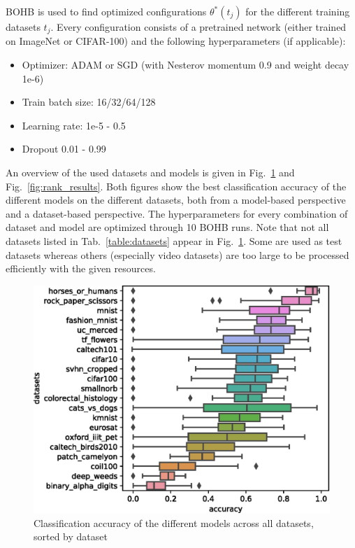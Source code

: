 \documentclass{article}
\begin{document}
BOHB is used to find optimized configurations $\theta^*(t_j)$ for the different training datasets $t_j$. Every configuration consists of a pretrained network (either trained on ImageNet or CIFAR-100) and the following hyperparameters (if applicable):
%
\begin{itemize}
\item Optimizer: ADAM or SGD (with Nesterov momentum 0.9 and weight decay 1e-6)
\item Train batch size: 16/32/64/128
\item Learning rate: 1e-5 - 0.5
\item Dropout 0.01 - 0.99
\end{itemize}
%
An overview of the used datasets and models is given in Fig.~\ref{fig:dataset_results} and Fig.~\ref{fig:rank_results}. Both figures show the best classification accuracy of the different models on the different datasets, both from a model-based perspective and a dataset-based perspective. The hyperparameters for every combination of dataset and model are optimized through 10 BOHB runs. Note that not all datasets listed in Tab.~\ref{table:datasets} appear in Fig.~\ref{fig:dataset_results}. Some are used as test datasets whereas others (especially video datasets) are too large to be processed efficiently with the given resources.
%
\begin{figure}[htb]
\begin{center}
 	\includegraphics[width=0.95\linewidth]{../figures/dataset_results.eps} 
\end{center}
\caption{Classification accuracy of the different models across all datasets, sorted by dataset}
\label{fig:dataset_results}
\end{figure} 
\end{document}
